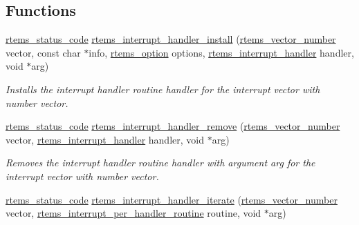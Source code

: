 \subsection*{Functions}
\begin{DoxyCompactItemize}
\item 
\mbox{\hyperlink{group__ClassicStatus_ga545d41846817eaba6143d52ee4d9e9fe}{rtems\+\_\+status\+\_\+code}} \mbox{\hyperlink{group__rtems__interrupt__extension_ga086cc450fcdc9e37bfd0744a763dbfd4}{rtems\+\_\+interrupt\+\_\+handler\+\_\+install}} (\mbox{\hyperlink{group__ClassicINTR_ga3e434c197d99f128e78cae4d9358bd8b}{rtems\+\_\+vector\+\_\+number}} vector, const char $\ast$info, \mbox{\hyperlink{group__ClassicOptions_gad26685eb0e60a9650082935c31920e29}{rtems\+\_\+option}} options, \mbox{\hyperlink{group__rtems__interrupt__extension_gab39bd096ab2c3b41d03dace0e9777b08}{rtems\+\_\+interrupt\+\_\+handler}} handler, void $\ast$arg)
\begin{DoxyCompactList}\small\item\em Installs the interrupt handler routine {\itshape handler} for the interrupt vector with number {\itshape vector}. \end{DoxyCompactList}\item 
\mbox{\hyperlink{group__ClassicStatus_ga545d41846817eaba6143d52ee4d9e9fe}{rtems\+\_\+status\+\_\+code}} \mbox{\hyperlink{group__rtems__interrupt__extension_ga90011d3f7a1f614913fd6386f1725b9d}{rtems\+\_\+interrupt\+\_\+handler\+\_\+remove}} (\mbox{\hyperlink{group__ClassicINTR_ga3e434c197d99f128e78cae4d9358bd8b}{rtems\+\_\+vector\+\_\+number}} vector, \mbox{\hyperlink{group__rtems__interrupt__extension_gab39bd096ab2c3b41d03dace0e9777b08}{rtems\+\_\+interrupt\+\_\+handler}} handler, void $\ast$arg)
\begin{DoxyCompactList}\small\item\em Removes the interrupt handler routine {\itshape handler} with argument {\itshape arg} for the interrupt vector with number {\itshape vector}. \end{DoxyCompactList}\item 
\mbox{\hyperlink{group__ClassicStatus_ga545d41846817eaba6143d52ee4d9e9fe}{rtems\+\_\+status\+\_\+code}} \mbox{\hyperlink{group__rtems__interrupt__extension_ga31d23275b676018c06e13c7bedc87983}{rtems\+\_\+interrupt\+\_\+handler\+\_\+iterate}} (\mbox{\hyperlink{group__ClassicINTR_ga3e434c197d99f128e78cae4d9358bd8b}{rtems\+\_\+vector\+\_\+number}} vector, \mbox{\hyperlink{group__rtems__interrupt__extension_gad3e88a9acfac97a5021ff98471f5cd71}{rtems\+\_\+interrupt\+\_\+per\+\_\+handler\+\_\+routine}} routine, void $\ast$arg)

\end{DoxyCompactItemize}
